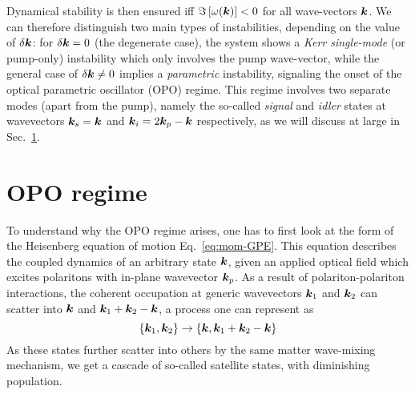 Dynamical stability is then ensured iff
$\Im\left[\omega(\bm{k})\right] < 0$ for all wave-vectors $\bm{k}$.  We can
therefore distinguish two main types of instabilities, depending on
the value of $\delta\bm{k}$: for $\delta\bm{k} =0$ (the degenerate case),
the system shows a \textit{Kerr single-mode} (or pump-only)
instability which only involves the pump wave-vector, while the
general case of $\delta\bm{k} \neq 0$ implies a \textit{parametric}
instability, signaling the onset of the optical parametric oscillator
(OPO) regime. This regime involves two separate modes (apart from the
pump), namely the so-called \textit{signal} and \textit{idler} states
at wavevectors $\bm{k}_s = \bm{k}$ and $\bm{k}_i = 2\bm{k}_p - \bm{k}$ respectively,
as we will discuss at large in Sec.~\ref{sec:opo}.



\section{OPO regime}
\label{sec:opo}


To understand why the OPO regime arises, one has to first look at the
form of the Heisenberg equation of motion Eq.~\eqref{eq:mom-GPE}. This
equation describes the coupled dynamics of an arbitrary state $\bm{k}$,
given an applied optical field which excites polaritons with in-plane
wavevector $\bm{k}_p$. As a result of polariton-polariton interactions,
the coherent occupation at generic wavevectors $\bm{k}_1$ and $\bm{k}_2$ can
scatter into $\bm{k}$ and $\bm{k}_1 + \bm{k}_2 - \bm{k}$, a process one can
represent as
%
\begin{equation}\label{eq:scattering-cascade}
  \left\{\bm{k}_1, \bm{k}_2\right\} \rightarrow \left\{\bm{k}, \bm{k}_1 + \bm{k}_2 - \bm{k}\right\}
\end{equation}
% 
As these states further scatter into others by the same matter
wave-mixing mechanism, we get a cascade of so-called satellite states,
with diminishing population.  


